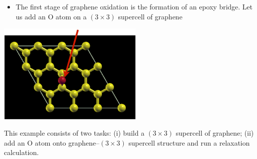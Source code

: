 \documentclass[landscape]{foils}
\begin{document}

\parbox{15cm}{
  \begin{itemize}
  \item The first stage of graphene oxidation is the formation of an
    epoxy bridge. Let us add an O atom on a $(3\times3)$ supercell of
    graphene
  \end{itemize}
}\hskip 2cm\parbox{7cm}{
  \begin{flushright}
    \includegraphics[width=7cm]{figs/graphene3x3-O.pdf}    
  \end{flushright}
}

This example consists of two tasks: (i) build a $(3\times3)$ supercell
of graphene; (ii) add an O atom onto graphene--$(3\times3)$ supercell
structure and run a relaxation calculation.
    
\end{document}
